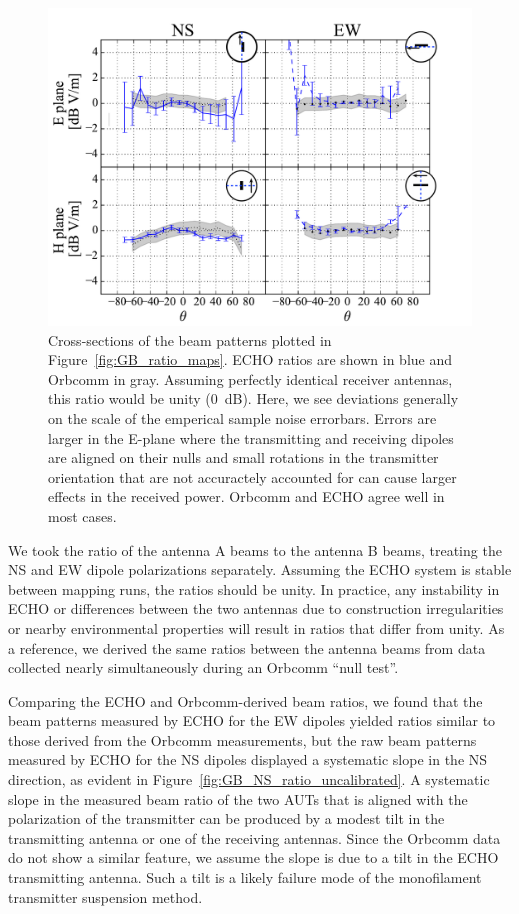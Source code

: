 \documentclass[preprint2,numberedappendix,tighten,twocolappendix]{aastex6}
\begin{document}
\begin{figure}
\begin{minipage}{0.45\textwidth}
\includegraphics[width=\columnwidth]{figures/GB_ratio_slice_5dB.pdf}
\caption{Cross-sections of the beam patterns plotted in Figure~\ref{fig:GB_ratio_maps}.  ECHO ratios are shown in blue and Orbcomm in gray.     Assuming perfectly identical receiver antennas, this ratio would be unity (0~dB). Here, we see deviations generally on the scale of the emperical sample noise errorbars.  Errors are larger in the E-plane where the transmitting and receiving dipoles are aligned on their nulls and small rotations in the transmitter orientation that are not accuractely accounted for can cause larger effects in the received power.  Orbcomm and ECHO agree well in most cases.
\label{fig:GB_ratio_slices}}
\end{minipage}\hfill
\end{figure}


We took the ratio of the antenna A beams to the antenna B beams, treating the NS and EW dipole polarizations separately.  Assuming the ECHO system is stable between mapping runs, the ratios should be unity.  In practice, any instability in ECHO or differences between the two antennas due to construction irregularities or nearby environmental properties will result in ratios that differ from unity.  As a reference, we derived the same ratios between the antenna beams from data collected nearly simultaneously during an Orbcomm ``null test''.   

Comparing the ECHO and Orbcomm-derived beam ratios, we found that the beam patterns measured by ECHO for the EW dipoles yielded ratios similar to those derived from the Orbcomm measurements, but the raw beam patterns measured by ECHO for the NS dipoles displayed a systematic slope in the NS direction, as evident in Figure~\ref{fig:GB_NS_ratio_uncalibrated}.  A systematic slope in the measured beam ratio of the two AUTs that is aligned with the polarization of the transmitter can be produced by a modest tilt in the transmitting antenna or one of the receiving antennas.  Since the Orbcomm data do not show a similar feature, we assume the slope is due to a tilt in the ECHO transmitting antenna.  Such a tilt is a likely failure mode of the monofilament transmitter suspension method.  
\end{document}
